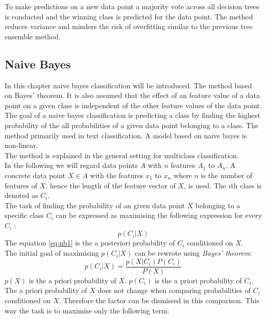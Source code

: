 To make predictions on a new data point  a majority vote across all decision trees is conducted and the winning class is predicted for the data point. The method reduces variance and minders the risk of overfitting similar to the previous tree ensemble method.\cite{friedman2000additive} \cite{james2013introduction}

\subsection{Naive Bayes}
In this chapter naive bayes classification will be introduced. The method based on Bayes’ theorem. It is also assumed that the effect of an feature value of a data point on a given class is independent of the other feature values of the data point. The goal of a naive bayes classification is predicting a class by finding the highest probability of the all probabilities of a given data point belonging to a class. The method primarily used in text classification.
A model based on naive bayes is non-linear.
\\
The method is explained in the general setting for multiclass classification.
\\
In the following we will regard data points $A$ with $n$ features $A_1$ to $A_n$. A concrete data point $X \in A$ with the features $x_1$ to $x_n$ where $n$ is the number of features of $X$, hence the length of the feature vector of $X$, is used. The $i$th class is denoted as $C_i$.\\
The task of finding the probability of an given data point $X$ belonging to a specific class $C_i$ can be expressed as maximising the following expression for every $C_i$ :
\begin{equation} \label{eq:nb1}
 p(C_i|X)
\end{equation}
The equation \ref{eq:nb1} is the a posteriori probability of $C_i$ conditioned on $X$.
\\
The initial goal of maximising $p(C_i|X)$ can be rewrote using \emph{Bayes' theorem}:
\begin{equation} \label{eq:nb2}
p(C_i|X)=\frac{p(X|C_i) P(C_i)}{P(X)}
\end{equation}
$p(X)$ is the a priori probability of $X$. $p(C_i)$ is the a priori probability of $C_i$.
\\
The a priori probability of $X$ does not change when comparing probabilities of $C_i$ conditioned on $X$. Therefore the factor can be dismissed in this comparison. This way the task is to maximise only the following term:

